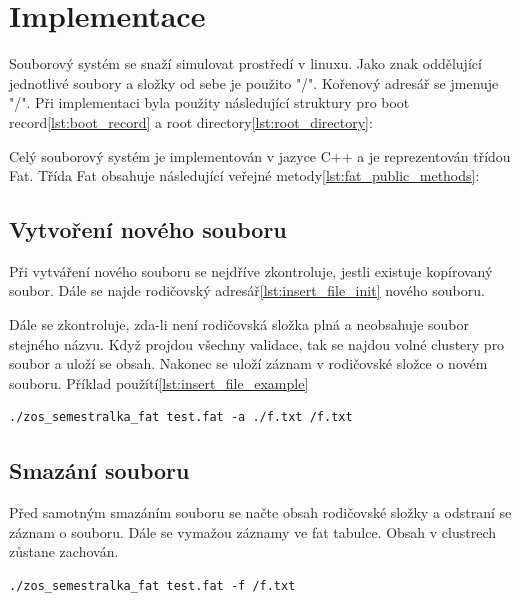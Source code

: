 \documentclass{report}
\begin{document}
\chapter*{Implementace}
Souborový systém se snaží simulovat prostředí v linuxu. Jako znak oddělující jednotlivé soubory a složky od sebe je použito "/". Kořenový adresář se jmenuje "/". Při implementaci byla použity následující struktury pro boot record\ref{lst:boot_record} a root directory\ref{lst:root_directory}:


Celý souborový systém je implementován v jazyce C++ a je reprezentován třídou Fat. Třída Fat obsahuje následující veřejné metody\ref{lst:fat_public_methods}:


\section*{Vytvoření nového souboru}
Při vytváření nového souboru se nejdříve zkontroluje, jestli existuje kopírovaný soubor. Dále se najde rodičovský adresář\ref{lst:insert_file_init} nového souboru.

Dále se zkontroluje, zda-li není rodičovská složka plná a neobsahuje soubor stejného názvu. Když projdou všechny validace, tak se najdou volné clustery pro soubor a uloží se obsah. Nakonec se uloží záznam v rodičovské složce o novém souboru. Příklad použítí\ref{lst:insert_file_example}
\begin{lstlisting}[caption=Vytvoření nového souboru,label=lst:insert_file_example, language={}]
./zos_semestralka_fat test.fat -a ./f.txt /f.txt
 \end{lstlisting}

\section*{Smazání souboru}
Před samotným smazáním souboru se načte obsah rodičovské složky a odstraní se záznam o souboru. Dále se vymažou záznamy ve fat tabulce. Obsah v clustrech zůstane zachován.
\begin{lstlisting}[caption=Smazání souboru,label=lst:delete_file_example, language={}]
./zos_semestralka_fat test.fat -f /f.txt
 \end{lstlisting}
\end{document}
